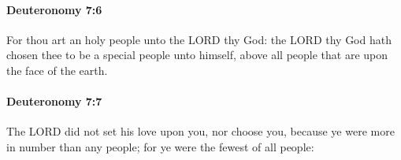		\paragraph{Deuteronomy 7:6} %
			\label{DEUTERONOMY-7-6}

			For thou art an holy people unto the LORD thy God: the LORD thy God hath chosen thee to be a special people unto himself, above all people that are upon the face of the earth.


		\paragraph{Deuteronomy 7:7} %
			\label{DEUTERONOMY-7-7}

			The LORD did not set his love upon you, nor choose you, because ye were more in number than any people; for ye were the fewest of all people:


